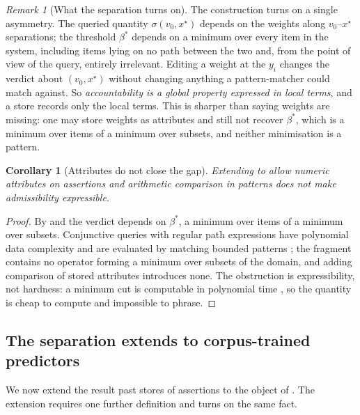 \documentclass[11pt,twocolumn,a4paper]{article}
\theoremstyle{dirthm}
\newtheorem{corollary}[theorem]{Corollary}
\theoremstyle{definition}
\theoremstyle{remark}
\newtheorem{remark}[theorem]{Remark}
\newcommand{\flo}{\beta}
\newcommand{\str}{\sigma}
\begin{document}
\begin{remark}[What the separation turns on]
\label{rem:separation-meaning}
The construction turns on a single asymmetry. The queried quantity
$\str(v_0,x^{\star})$ depends on the weights along $v_0$--$x^{\star}$
separations; the threshold $\flo^{\ast}$ depends on a minimum over every item
in the system, including items lying on no path between the two and, from the
point of view of the query, entirely irrelevant. Editing a weight at the
$y_i$ changes the verdict about $(v_0,x^{\star})$ without changing anything a
pattern-matcher could match against. So \emph{accountability is a global
property expressed in local terms}, and a store records only the local terms.
This is sharper than saying weights are missing: one may store weights as
attributes and still not recover $\flo^{\ast}$, which is a minimum over items
of a minimum over subsets, and neither minimisation is a pattern.
\end{remark}

\begin{corollary}[Attributes do not close the gap]
\label{cor:attributed}
Extending  to allow numeric attributes on assertions and
arithmetic comparison in patterns does not make admissibility expressible.
\end{corollary}

\begin{proof}
By  and  the verdict
depends on $\flo^{\ast}$, a minimum over items of a minimum over subsets.
Conjunctive queries with regular path expressions have polynomial data
complexity and are evaluated by matching bounded patterns
\citep{perez2009,angles2017,barcelo2013,chandramerlin1977}; the fragment
contains no operator forming a minimum over subsets of the domain, and adding
comparison of stored attributes introduces none. The obstruction is
expressibility, not hardness: a minimum cut is computable in polynomial time
\citep{fordfulkerson1956,stoer1997}, so the quantity is cheap to compute and
impossible to phrase.
\end{proof}

\subsection{The separation extends to corpus-trained predictors}

We now extend the result past stores of assertions to the object of
. The extension requires one further definition and turns
on the same fact.
\end{document}

